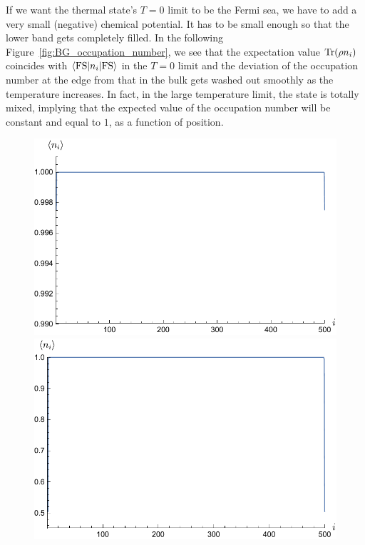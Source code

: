 If we want the thermal state's $T=0$ limit to be the Fermi sea, we have to add a very small (negative) chemical potential. It has to be small enough so that the lower band gets completely filled. In the following Figure~\ref{fig:BG_occupation_number}, we see that the expectation value $\text{Tr}(\rho n_i)$ coincides with $\langle \text{FS} |n_i| \text{FS} \rangle$ in the $T=0$ limit and the deviation of the occupation number at the edge from that in the bulk gets washed out smoothly as the temperature increases. In fact, in the large temperature limit, the state is totally mixed, implying that the expected value of the occupation number will be constant and equal to $1$, as a function of position.  

\begin{figure}[h!]
\begin{minipage}{0.45\textwidth}
\centering
\includegraphics[scale=0.55]{occupation_T_100.pdf}
\includegraphics[scale=0.55]{occupation_zero_T.pdf}

\end{minipage}
\end{figure}
